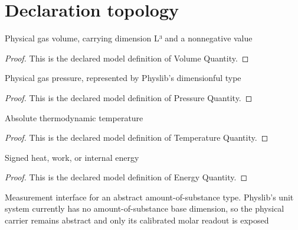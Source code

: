 \section{Declaration topology}
\begin{definition}
  \label{def:physics:phyx-mini-0434:phyxminiproblems-problemphyxmini0434-volumequantity}
  Physical gas volume, carrying dimension L³ and a nonnegative value
\end{definition}
\begin{proof}
  This is the declared model definition of Volume Quantity.
\end{proof}
\begin{definition}
  \label{def:physics:phyx-mini-0434:phyxminiproblems-problemphyxmini0434-pressurequantity}
  Physical gas pressure, represented by Physlib's dimensionful type
\end{definition}
\begin{proof}
  This is the declared model definition of Pressure Quantity.
\end{proof}
\begin{definition}
  \label{def:physics:phyx-mini-0434:phyxminiproblems-problemphyxmini0434-temperaturequantity}
  Absolute thermodynamic temperature
\end{definition}
\begin{proof}
  This is the declared model definition of Temperature Quantity.
\end{proof}
\begin{definition}
  \label{def:physics:phyx-mini-0434:phyxminiproblems-problemphyxmini0434-energyquantity}
  Signed heat, work, or internal energy
\end{definition}
\begin{proof}
  This is the declared model definition of Energy Quantity.
\end{proof}
\begin{definition}
  \label{def:physics:phyx-mini-0434:phyxminiproblems-problemphyxmini0434-molarmeasurement}
  Measurement interface for an abstract amount-of-substance type. Physlib's unit system currently has no amount-of-substance base dimension, so the physical carrier remains abstract and only its calibrated molar readout is exposed
\end{definition}
